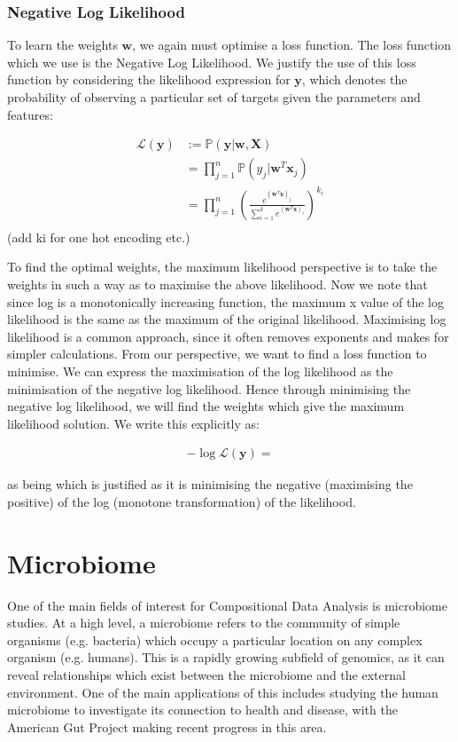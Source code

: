 \subsubsection{Negative Log Likelihood}
To learn the weights $\mathbf{w}$, we again must optimise a loss function. The loss function which we use is the Negative Log Likelihood. We justify the use of this loss function by considering the likelihood expression for $\mathbf{y}$, which denotes the probability of observing a particular set of targets given the parameters and features:

\begin{align}
\mathcal{L}(\mathbf{y}) &:=  \mathbb{P}(\mathbf{y}| \mathbf{w}, \mathbf{X}) \\
&= \prod_{j=1}^{n}\mathbb{P}(y_j| \mathbf{w}^T\mathbf{x}_j) \tag{Since the observations are independent} \\
&= \prod_{j=1}^{n}\left(\frac{e^{(\mathbf{w}^T\mathbf{x})_j}}{\sum_{i=1}^{k} e^{(\mathbf{w}^T\mathbf{x})_i}}\right)^{k_i}  \\	 
\end{align}
(add ki for one hot encoding etc.)

To find the optimal weights, the maximum likelihood perspective is to take the weights in such a way as to maximise the above likelihood. Now we note that since log is a monotonically increasing function, the maximum x value of the log likelihood is the same as the maximum of the original likelihood. Maximising log likelihood is a common approach, since it often removes exponents and makes for simpler calculations. From our perspective, we want to find a loss function to minimise. We can express the maximisation of the log likelihood as the minimisation of the negative log likelihood. Hence through minimising the negative log likelihood, we will find the weights which give the maximum likelihood solution. We write this explicitly as:

\begin{align}
-\log\mathcal{L}(\mathbf{y}) = 
\end{align}

as being which is justified as it is minimising the negative (maximising the positive) of the log (monotone transformation) of the likelihood. 




\section{Microbiome}
\label{microbiome}
One of the main fields of interest for Compositional Data Analysis is microbiome studies. At a high level, a  microbiome refers to the community of simple organisms (e.g. bacteria) which occupy a particular location on any complex organism (e.g. humans). This is a rapidly growing subfield of genomics, as it can reveal relationships which exist between the microbiome and the external environment. One of the main applications of this includes studying the human microbiome to investigate its connection to health and disease, with the American Gut Project \citep{McDonalde00031-18} making recent progress in this area.

